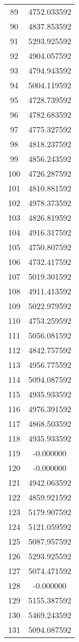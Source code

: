 \documentclass[12pt]{article}
\begin{document}
\begin{longtable}{@{}cc@{}}
89 & 4752.033592 \\
90 & 4837.853592 \\
91 & 5293.925592 \\
92 & 4904.057592 \\
93 & 4794.943592 \\
94 & 5004.119592 \\
95 & 4728.739592 \\
96 & 4782.683592 \\
97 & 4775.327592 \\
98 & 4818.237592 \\
99 & 4856.243592 \\
100 & 4726.287592 \\
101 & 4810.881592 \\
102 & 4978.373592 \\
103 & 4826.819592 \\
104 & 4916.317592 \\
105 & 4750.807592 \\
106 & 4732.417592 \\
107 & 5019.301592 \\
108 & 4911.413592 \\
109 & 5022.979592 \\
110 & 4753.259592 \\
111 & 5056.081592 \\
112 & 4842.757592 \\
113 & 4956.775592 \\
114 & 5094.087592 \\
115 & 4935.933592 \\
116 & 4976.391592 \\
117 & 4868.503592 \\
118 & 4935.933592 \\
119 & -0.000000 \\
120 & -0.000000 \\
121 & 4942.063592 \\
122 & 4859.921592 \\
123 & 5179.907592 \\
124 & 5121.059592 \\
125 & 5087.957592 \\
126 & 5293.925592 \\
127 & 5074.471592 \\
128 & -0.000000 \\
129 & 5155.387592 \\
130 & 5469.243592 \\
131 & 5094.087592 \\

\end{longtable}
\end{document}
